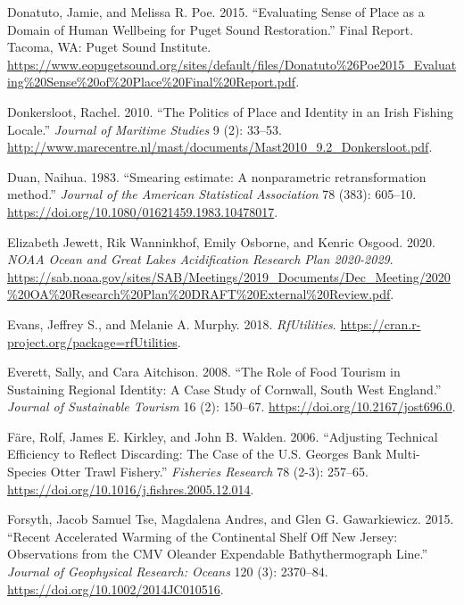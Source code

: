 \documentclass[
]{book}
\newlength{\cslhangindent}
\newenvironment{cslreferences}%
  {\setlength{\parindent}{0pt}%
  \everypar{\setlength{\hangindent}{\cslhangindent}}\ignorespaces}%
  {\par}
\begin{document}
\begin{cslreferences}
\leavevmode\hypertarget{ref-donatuto_evaluating_2015}{}%
Donatuto, Jamie, and Melissa R. Poe. 2015. ``Evaluating Sense of Place as a Domain of Human Wellbeing for Puget Sound Restoration.'' Final Report. Tacoma, WA: Puget Sound Institute. \url{https://www.eopugetsound.org/sites/default/files/Donatuto\%26Poe2015_Evaluating\%20Sense\%20of\%20Place\%20Final\%20Report.pdf}.

\leavevmode\hypertarget{ref-donkersloot_politics_2010}{}%
Donkersloot, Rachel. 2010. ``The Politics of Place and Identity in an Irish Fishing Locale.'' \emph{Journal of Maritime Studies} 9 (2): 33--53. \url{http://www.marecentre.nl/mast/documents/Mast2010_9.2_Donkersloot.pdf}.

\leavevmode\hypertarget{ref-Duan1983}{}%
Duan, Naihua. 1983. ``Smearing estimate: A nonparametric retransformation method.'' \emph{Journal of the American Statistical Association} 78 (383): 605--10. \url{https://doi.org/10.1080/01621459.1983.10478017}.

\leavevmode\hypertarget{ref-jewett2020}{}%
Elizabeth Jewett, Rik Wanninkhof, Emily Osborne, and Kenric Osgood. 2020. \emph{NOAA Ocean and Great Lakes Acidification Research Plan 2020-2029}. \url{https://sab.noaa.gov/sites/SAB/Meetings/2019_Documents/Dec_Meeting/2020\%20OA\%20Research\%20Plan\%20DRAFT\%20External\%20Review.pdf}.

\leavevmode\hypertarget{ref-rfUtilities-package}{}%
Evans, Jeffrey S., and Melanie A. Murphy. 2018. \emph{RfUtilities}. \url{https://cran.r-project.org/package=rfUtilities}.

\leavevmode\hypertarget{ref-everett_role_2008}{}%
Everett, Sally, and Cara Aitchison. 2008. ``The Role of Food Tourism in Sustaining Regional Identity: A Case Study of Cornwall, South West England.'' \emph{Journal of Sustainable Tourism} 16 (2): 150--67. \url{https://doi.org/10.2167/jost696.0}.

\leavevmode\hypertarget{ref-fare_adjusting_2006}{}%
Färe, Rolf, James E. Kirkley, and John B. Walden. 2006. ``Adjusting Technical Efficiency to Reflect Discarding: The Case of the U.S. Georges Bank Multi-Species Otter Trawl Fishery.'' \emph{Fisheries Research} 78 (2-3): 257--65. \url{https://doi.org/10.1016/j.fishres.2005.12.014}.

\leavevmode\hypertarget{ref-forsyth_recent_2015}{}%
Forsyth, Jacob Samuel Tse, Magdalena Andres, and Glen G. Gawarkiewicz. 2015. ``Recent Accelerated Warming of the Continental Shelf Off New Jersey: Observations from the CMV Oleander Expendable Bathythermograph Line.'' \emph{Journal of Geophysical Research: Oceans} 120 (3): 2370--84. \url{https://doi.org/10.1002/2014JC010516}.


\end{cslreferences}
\end{document}
